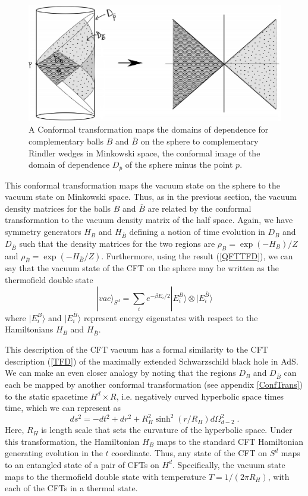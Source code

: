 \documentclass[12pt,epsf]{article}
\newcommand{\be}{\begin{equation}}
\newcommand{\ee}{\end{equation}}
\begin{document}
\begin{figure}
\centering
\includegraphics[width = 0.8 \textwidth]{DptoRind.eps}
\caption{A Conformal transformation maps the domains of dependence for complementary balls $B$ and $\bar{B}$ on the sphere to complementary Rindler wedges in Minkowski space, the conformal image of the domain of dependence $D_{\bar{p}}$ of the sphere minus the point $p$.}
\label{DptoRind}
\end{figure}


This conformal transformation maps the vacuum state on the sphere to the vacuum state on Minkowski space. Thus, as in the previous section, the vacuum density matrices for the balls $B$ and $\bar{B}$  are related by the conformal transformation to the vacuum density matrix of the half space. Again, we have symmetry generators $H_B$ and $H_{\bar{B}}$ defining a notion of time evolution in $D_B$ and $D_{\bar{B}}$ such that the density matrices for the two regions are $\rho_B = \exp(-H_B)/Z$ and $\rho_{\bar{B}} = \exp(-H_{\bar{B}}/Z)$. Furthermore, using the result (\ref{QFTTFD}), we can say that the vacuum state of the CFT on the sphere may be written as the thermofield double state
\be
|vac \rangle_{S^d} = \sum_i e^{- \beta E_i /2} | E^{B}_i \rangle \otimes |E^{\bar{B}}_i \rangle
\ee
where $|E^{B}_i \rangle$ and $|E^{\bar{B}}_i \rangle$ represent energy eigenstates with respect to the Hamiltonians $H_B$ and $H_{\bar{B}}$.

This description of the CFT vacuum has a formal similarity to the CFT description (\ref{TFD}) of the maximally extended Schwarzschild black hole in AdS. We can make an even closer analogy by noting that the regions $D_B$ and $D_{\bar{B}}$ can each be mapped by another conformal transformation (see appendix \ref{ConfTrans}) to the static spacetime $H^d \times R$, i.e. negatively curved hyperbolic space times time, which we can represent as
\be
\label{hyperbolic_metric}
ds^2 = -dt^2 + dr^2 + R_H^2 \sinh^2(r/R_H) d \Omega^2_{d-2} \; .
\ee
Here, $R_H$ is length scale that sets the curvature of the hyperbolic space. Under this transformation, the Hamiltonian $H_B$ maps to the standard CFT Hamiltonian generating evolution in the $t$ coordinate. Thus, any state of the CFT on $S^d$ maps to an entangled state of a pair of CFTs on $H^d$. Specifically, the vacuum state maps to the thermofield double state with temperature $T = 1/(2 \pi R_H)$, with each of the CFTs in a thermal state.
\end{document}
